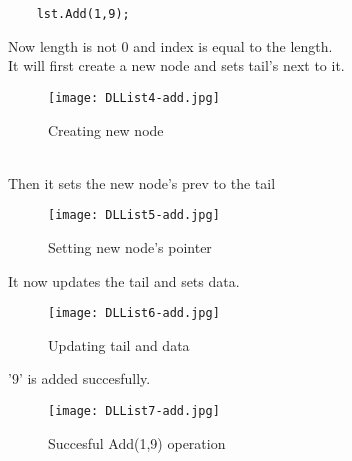 \documentclass[11pt,fleqn]{book} %
\begin{document}
\begin{example}
  \begin{lstlisting}
    lst.Add(1,9);
  \end{lstlisting}
  Now length is not 0 and index is equal to the length.\\
  It will first create a new node and sets tail's next to it.
  \begin{figure}[H]
    \centering
    \texttt{[image: DLList4-add.jpg]}
    \caption{Creating new node}
  \end{figure} ~\\
  Then it sets the new node's prev to the tail
  \begin{figure}[H]
    \centering
    \texttt{[image: DLList5-add.jpg]}
    \caption{Setting new node's pointer}
  \end{figure}
  It now updates the tail and sets data.
  \begin{figure}[H]
    \centering
    \texttt{[image: DLList6-add.jpg]}
    \caption{Updating tail and data}
  \end{figure}
  '9' is added succesfully.
  {\begin{figure}[H]
      \centering
      \texttt{[image: DLList7-add.jpg]}
      \caption{Succesful Add(1,9) operation}
    \end{figure}}
\end{example}
\end{document}
